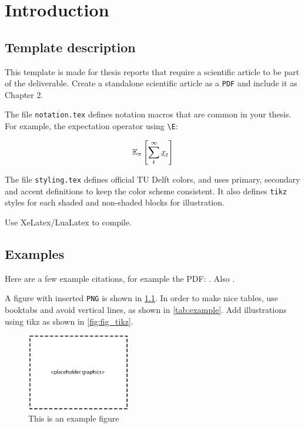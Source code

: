 \chapter{Introduction}
\label{chapter:intro}

\section{Template description}

This template is made for thesis reports that require a scientific article to be part of the deliverable.
Create a standalone scientific article as a \texttt{PDF} and include it as Chapter 2.

The file \texttt{notation.tex} defines notation macros that are common in your thesis. For example, the expectation operator using \texttt{\textbackslash E}:

\begin{equation}
\E[\pi]{\sum_{t}^{\infty} \x_t}
\end{equation}

The file \texttt{styling.tex} defines official TU Delft colors, and uses primary, secondary and accent definitions to keep the color scheme consistent.
It also defines \texttt{tikz} styles for each shaded and non-shaded blocks for illustration.

Use XeLatex/LuaLatex to compile.

\section{Examples}

Here are a few example citations, for example the PDF: \cite{einstein1905electrodynamics}. Also \cite{mnih2015human}.

A figure with inserted \texttt{PNG} is shown in \cref{fig:example}.
In order to make nice tables, use booktabs and avoid vertical lines, as shown in \cref{tab:example}.
Add illustrations using tikz as shown in \cref{fig:fig_tikz}.

\begin{figure}[ht]
    \centering
    \includegraphics[width=0.4\textwidth]{figures/placeholder_black.png}
    \caption{This is an example figure}
    \label{fig:example}
\end{figure}

